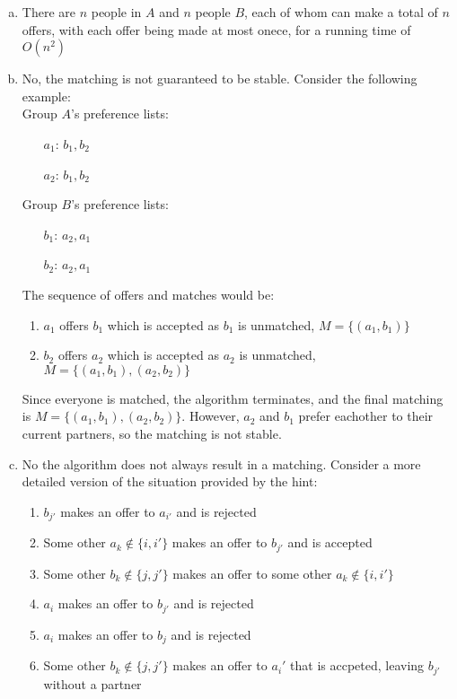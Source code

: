 \documentclass{article}
\begin{document}
\begin{enumerate}[a)]
    \item There are $n$ people in $A$ and $n$ people $B$, each of whom can make a total of $n$ offers, with each offer being made at most onece, for a running time of $O(n^2)$
    \item No, the matching is not guaranteed to be stable. Consider the following example: \\[0.75ex]
    Group $A$'s preference lists: 
    \begin{enumerate}
        \item[$a_1$:] $b_1, b_2$
        \item[$a_2$:] $b_1, b_2$
    \end{enumerate} 
    Group $B$'s preference lists: 
    \begin{enumerate}
        \item[$b_1$:] $a_2, a_1$
        \item[$b_2$:] $a_2, a_1$
    \end{enumerate} 
    The sequence of offers and matches would be: 
    \begin{enumerate}[1.]
        \item $a_1$ offers $b_1$ which is accepted as $b_1$ is unmatched, $M = \{(a_1, b_1)\}$
        \item $b_2$ offers $a_2$ which is accepted as $a_2$ is unmatched, $M = \{(a_1, b_1), (a_2, b_2)\}$
    \end{enumerate}
    Since everyone is matched, the algorithm terminates, and the final matching is $M = \{(a_1, b_1), (a_2, b_2)\}$. However, $a_2$ and $b_1$ prefer eachother to their current partners, so the matching is not stable. 
    \item No the algorithm does not always result in a matching. Consider a more detailed version of the situation provided by the hint:  
    \begin{enumerate}[1.]
        \item $b_{j'}$ makes an offer to $a_{i'}$ and is rejected
        \item Some other $a_k \notin \{i, i'\}$ makes an offer to $b_{j'}$ and is accepted 
        \item Some other $b_k \notin \{j, j'\}$ makes an offer to some other $a_k \notin \{i, i'\}$
        \item $a_i$ makes an offer to $b_{j'}$ and is rejected
        \item $a_i$ makes an offer to $b_{j}$ and is rejected
        \item Some other $b_k \notin \{j, j'\}$ makes an offer to $a_i'$ that is accpeted, leaving $b_{j'}$ without a partner

\end{enumerate}
\end{enumerate}
\end{document}
